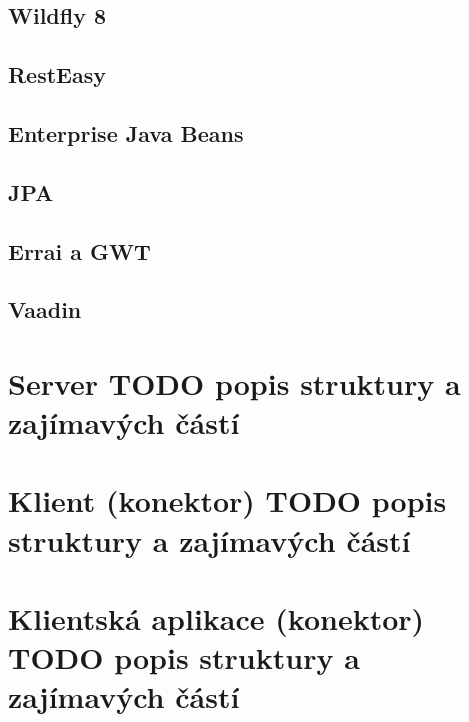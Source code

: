 \documentclass[thesis=M,czech]{FITthesis}[2014/05/6]
\begin{document}
\subsection{Wildfly 8}
\subsection{RestEasy}
\subsection{Enterprise Java Beans}
\subsection{JPA}
\subsection{Errai a GWT}
\subsection{Vaadin}

\section{Server TODO popis struktury a zajímavých částí}
\section{Klient (konektor) TODO popis struktury a zajímavých částí}
\section{Klientská aplikace (konektor) TODO popis struktury a zajímavých částí}

\begin{conclusion}
\end{conclusion}




\appendix
\end{document}
